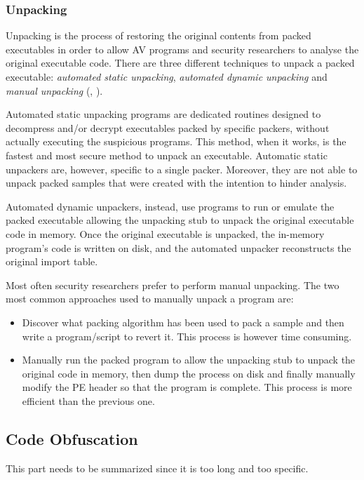 \documentclass[pdfa%
,cucitura%
]{toptesi}
\begin{document}
\subsubsection{Unpacking}
Unpacking is the process of restoring the original contents from packed executables in order to allow AV programs and security researchers to analyse the original executable code. There are three different techniques to unpack a packed executable: \textit{automated static unpacking}, \textit{automated dynamic unpacking} and \textit{manual unpacking} (\cite{SikorskiPMA}, \cite{WeiRPM}).

Automated static unpacking programs are dedicated routines designed to decompress and/or decrypt executables packed by specific packers, without actually executing the suspicious programs. This method, when it works, is the fastest and most secure method to unpack an executable. Automatic static unpackers are, however, specific to a single packer. Moreover, they are not able to unpack packed samples that were created with the intention to hinder analysis.

Automated dynamic unpackers, instead, use programs to run or emulate the packed executable allowing the unpacking stub to unpack the original executable code in memory. Once the original executable is unpacked, the in-memory program's code is written on disk, and the automated unpacker reconstructs the original import table.

Most often security researchers prefer to perform manual unpacking. The two most common approaches used  to manually unpack a program are:
\begin{itemize}
	\item Discover what packing algorithm has been used to pack a sample and then write a program/script to revert it. This process is however time consuming.
	
	\item Manually run the packed program to allow the unpacking stub to unpack the original code in memory, then dump the process on disk and finally manually modify the PE header so that the program is complete. This process is more efficient than the previous one. 
\end{itemize}

\subsection{Code Obfuscation}
\color{Green}
This part needs to be summarized since it is too long and too specific.
\color{Black}
\end{document}
